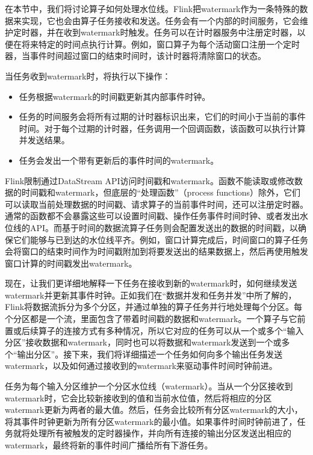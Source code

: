 \documentclass[cn,11pt,chinese]{elegantbook}
\providecommand{\tightlist}{%
  \setlength{\itemsep}{0pt}\setlength{\parskip}{0pt}}
\renewenvironment{quote}{\begin{customblockquote}\list{}{\rightmargin=0em\leftmargin=0em}%
\item\relax\color{blockquote-text}\ignorespaces}{\unskip\unskip\endlist\end{customblockquote}}
\begin{document}
在本节中，我们将讨论算子如何处理水位线。Flink把watermark作为一条特殊的数据来实现，它也会由算子任务接收和发送。任务会有一个内部的时间服务，它会维护定时器，并在收到watermark时触发。任务可以在计时器服务中注册定时器，以便在将来特定的时间点执行计算。例如，窗口算子为每个活动窗口注册一个定时器，当事件时间超过窗口的结束时间时，该计时器将清除窗口的状态。

当任务收到watermark时，将执行以下操作：

\begin{itemize}
\tightlist
\item
  任务根据watermark的时间戳更新其内部事件时钟。
\item
  任务的时间服务会将所有过期的计时器标识出来，它们的时间小于当前的事件时间。对于每个过期的计时器，任务调用一个回调函数，该函数可以执行计算并发送结果。
\item
  任务会发出一个带有更新后的事件时间的watermark。
\end{itemize}

\begin{quote}
Flink限制通过DataStream
API访问时间戳和watermark。函数不能读取或修改数据的时间戳和watermark，但底层的``处理函数''（process
functions）除外，它们可以读取当前处理数据的时间戳、请求算子的当前事件时间，还可以注册定时器。通常的函数都不会暴露这些可以设置时间戳、操作任务事件时间时钟、或者发出水位线的API。而基于时间的数据流算子任务则会配置发送出的数据的时间戳，以确保它们能够与已到达的水位线平齐。例如，窗口计算完成后，时间窗口的算子任务会将窗口的结束时间作为时间戳附加到将要发送出的结果数据上，然后再使用触发窗口计算的时间戳发出watermark。
\end{quote}

现在，让我们更详细地解释一下任务在接收到新的watermark时，如何继续发送watermark并更新其事件时钟。正如我们在``数据并发和任务并发''中所了解的，Flink将数据流拆分为多个分区，并通过单独的算子任务并行地处理每个分区。每个分区都是一个流，里面包含了带着时间戳的数据和watermark。一个算子与它前置或后续算子的连接方式有多种情况，所以它对应的任务可以从一个或多个``输入分区''接收数据和watermark，同时也可以将数据和watermark发送到一个或多个``输出分区''。接下来，我们将详细描述一个任务如何向多个输出任务发送watermark，以及如何通过接收到的watermark来驱动事件时间时钟前进。

任务为每个输入分区维护一个分区水位线（watermark）。当从一个分区接收到watermark时，它会比较新接收到的值和当前水位值，然后将相应的分区watermark更新为两者的最大值。然后，任务会比较所有分区watermark的大小，将其事件时钟更新为所有分区watermark的最小值。如果事件时间时钟前进了，任务就将处理所有被触发的定时器操作，并向所有连接的输出分区发送出相应的watermark，最终将新的事件时间广播给所有下游任务。
\end{document}
